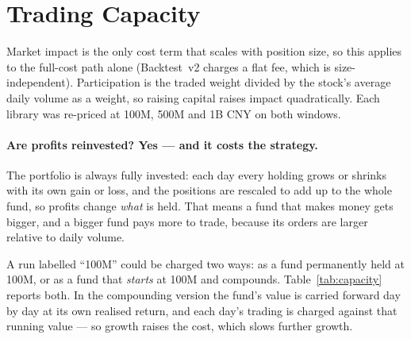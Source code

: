 \documentclass[11pt]{article}
\begin{document}
\section{Trading Capacity}
\label{sec:capacity}

Market impact is the only cost term that scales with position size, so this applies to
the full-cost path alone (Backtest~v2 charges a flat fee, which is size-independent).
Participation is the traded weight divided by the stock's average daily volume as a
weight, so raising capital raises impact quadratically. Each library was re-priced at
100M, 500M and 1B CNY on both windows.

\paragraph{Are profits reinvested? Yes --- and it costs the strategy.}
The portfolio is always fully invested: each day every holding grows or shrinks with
its own gain or loss, and the positions are rescaled to add up to the whole fund, so
profits change \emph{what} is held. That means a fund that makes money gets bigger, and
a bigger fund pays more to trade, because its orders are larger relative to daily
volume.

A run labelled ``100M'' could be charged two ways: as a fund permanently held at 100M,
or as a fund that \emph{starts} at 100M and compounds. Table~\ref{tab:capacity} reports
both. In the compounding version the fund's value is carried forward day by day at its
own realised return, and each day's trading is charged against that running value ---
so growth raises the cost, which slows further growth.
\end{document}
